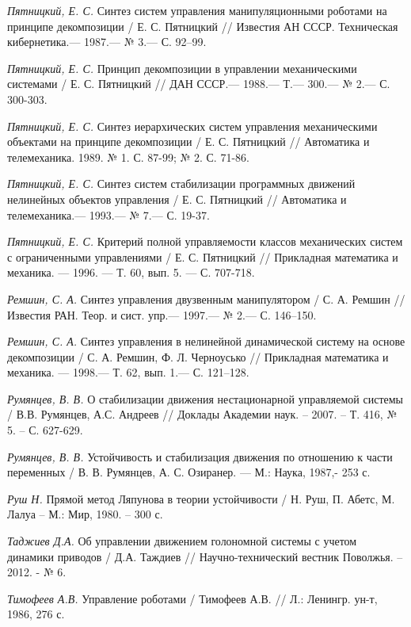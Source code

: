 \begin{thebibliography}{10}
	{\it Пятницкий, Е. С.} Синтез систем управления манипуляционными роботами на принципе декомпозиции
	/ Е. С. Пятницкий // Известия АН СССР. Техническая кибернетика.—
	1987.— № 3.— С. 92–99.
	
	{\it Пятницкий, Е. С.} Принцип декомпозиции в управлении механическими системами
	/ Е. С. Пятницкий // ДАН СССР.— 1988.— Т.— 300.— № 2.— С. 300-303.
	
	{\it Пятницкий, Е. С.} Синтез иерархических систем управления механическими объектами на принципе декомпозиции
	/ Е. С. Пятницкий // Автоматика и телемеханика. 1989. № 1. С. 87-99; № 2. С. 71-86.
	
	{\it Пятницкий, Е. С.} Синтез систем стабилизации программных движений нелинейных объектов управления
	/ Е. С. Пятницкий // Автоматика и телемеханика.— 1993.— № 7.— С. 19-37.
	
	{\it Пятницкий, Е. С.} Критерий полной управляемости классов механических систем с ограниченными управлениями 
	/ Е. С. Пятницкий // Прикладная математика и механика. — 1996. — Т. 60, вып. 5. — С. 707-718.
	
	{\it Ремшин, С. А.} Синтез управления двузвенным манипулятором /
	С. А. Ремшин // Известия РАН. Теор. и сист. упр.— 1997.— № 2.— С. 146–150.
	
	{\it Ремшин, С. А.} Синтез управления в нелинейной динамической систему на основе декомпозиции /
	С. А. Ремшин, Ф. Л. Черноусько // Прикладная математика и механика. — 1998.— Т. 62, вып. 1.— С. 121–128.
	
	{\it Румянцев, В. В.} О стабилизации движения нестационарной управляемой системы / В.В. Румянцев, А.С. Андреев // Доклады Академии наук. – 2007. 	– Т. 416, № 5. – С. 627-629.

	{\it Румянцев, В. В.} Устойчивость и стабилизация движения по отношению к части переменных /
	В. В. Румянцев, А. С. Озиранер. — М.: Наука, 1987,- 253 с.
	
	{\it Руш Н.} Прямой метод Ляпунова в теории устойчивости / Н. Руш, П. Абетс, М. Лалуа – М.: Мир, 1980. – 300 с.
	
	{\it Таджиев Д.А.} Об управлении движением голономной системы с учетом динамики приводов / Д.А. Таждиев // Научно-технический вестник Поволжья. 	– 2012. - № 6. 
	
	{\it Тимофеев А.В.} Управление роботами / Тимофеев А.В. // Л.: Ленингр. ун-т, 1986, 276 с.
	

\end{thebibliography}
